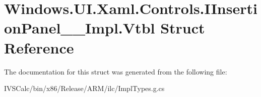 \hypertarget{struct_windows_1_1_u_i_1_1_xaml_1_1_controls_1_1_i_insertion_panel_____impl_1_1_vtbl}{}\section{Windows.\+U\+I.\+Xaml.\+Controls.\+I\+Insertion\+Panel\+\_\+\+\_\+\+Impl.\+Vtbl Struct Reference}
\label{struct_windows_1_1_u_i_1_1_xaml_1_1_controls_1_1_i_insertion_panel_____impl_1_1_vtbl}


The documentation for this struct was generated from the following file\+:\begin{DoxyCompactItemize}
\item 
I\+V\+S\+Calc/bin/x86/\+Release/\+A\+R\+M/ilc/Impl\+Types.\+g.\+cs\end{DoxyCompactItemize}
